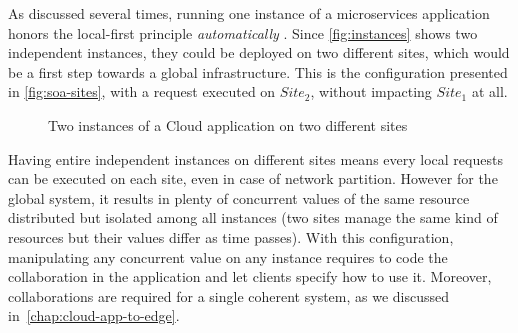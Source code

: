 As discussed several times, running one instance of a microservices
application honors the local-first principle \emph{automatically} .
%
Since \autoref{fig:instances} shows two independent instances, they
could be deployed on two different sites, which would be a first step
towards a global infrastructure.
%
This is the configuration presented in \autoref{fig:soa-sites}, with a
request executed on $Site_2$, without impacting $Site_1$ at all.

\begin{figure}[htbp]
  \centering
  \caption{Two instances of a Cloud application on two different sites}
  \label{fig:soa-sites}
\end{figure}


%
Having entire independent instances on different sites means every
local requests can be executed on each site, even in case of network
partition.
%
However for the global system, it results in plenty of concurrent
values of the same resource distributed but isolated among all
instances (\eg two sites manage the same kind of resources but
their values differ as time passes).
%
With this configuration, manipulating any concurrent value on any
instance requires to code the collaboration in the application and let
clients specify how to use it.
%
Moreover, collaborations are required for a single coherent system, as
we discussed in~\autoref{chap:cloud-app-to-edge}.


